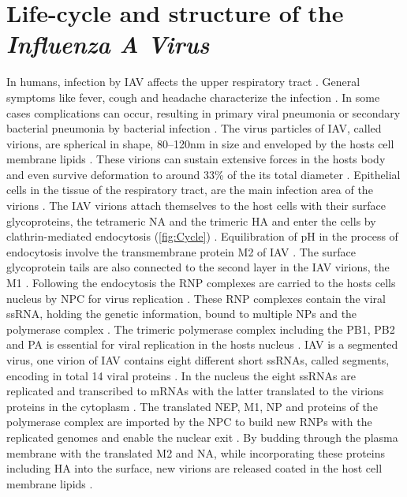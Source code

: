 \section{Life-cycle and structure of the \textit{Influenza A Virus}}

In humans, infection by \gls{IAV} affects the upper respiratory tract \autocite{julkunen_inflammatory_2000}. General symptoms like fever, cough and headache characterize the infection \autocite{julkunen_inflammatory_2000}. In some cases complications can occur, resulting in primary viral pneumonia or secondary bacterial pneumonia by bacterial infection \autocite{julkunen_inflammatory_2000}. The virus particles of \gls{IAV}, called virions, are spherical in shape, 80–120nm in size and enveloped by the hosts cell membrane lipids \autocite{oxford_chapter_1987, mudhakir_learning_2009, cann_chapter_2016}. These virions can sustain extensive forces in the hosts body and even survive deformation to around 33\% of the its total diameter \autocite{schaap_effect_2012}. Epithelial cells in the tissue of the respiratory tract, are the main infection area of the virions \autocite{oxford_chapter_1987}. The \gls{IAV} virions attach themselves to the host cells with their surface glycoproteins, the tetrameric \gls{NA} and the trimeric \gls{HA} and enter the cells by clathrin-mediated endocytosis (\autoref{fig:Cycle}) \autocite{wilson_structure_1981, varghese_structure_1983, jones_global_2008, mudhakir_learning_2009}. Equilibration of pH in the process of endocytosis involve the transmembrane protein \gls{M2} of \gls{IAV} \autocite{pielak_influenza_2011}. The surface glycoprotein tails are also connected to the second layer in the \gls{IAV} virions, the \gls{M1} \autocite{ali_influenza_2000}. Following the endocytosis the \gls{RNP} complexes are carried to the hosts cells nucleus by \gls{NPC} for virus replication \autocite{eisfeld_at_2015}. These \gls{RNP} complexes contain the viral \gls{ssRNA}, holding the genetic information, bound to multiple \glspl{NP} and the polymerase complex \autocite{eisfeld_at_2015}. The trimeric polymerase complex including the \gls{PB1}, \gls{PB2} and \gls{PA} is essential for viral replication in the hosts nucleus \autocite{area_3d_2004, eisfeld_at_2015}. \gls{IAV} is a segmented virus, one virion of \gls{IAV} contains eight different short \glspl{ssRNA}, called segments, encoding in total 14 viral proteins \autocite{eisfeld_at_2015}. In the nucleus the eight \glspl{ssRNA} are replicated and transcribed to \glspl{mRNA} with the latter translated to the virions proteins in the cytoplasm \autocite{eisfeld_at_2015}. The translated \gls{NEP}, \gls{M1}, \gls{NP} and proteins of the polymerase complex are imported by the \gls{NPC} to build new \glspl{RNP} with the replicated genomes and enable the nuclear exit \autocite{eisfeld_at_2015}. By budding through the plasma membrane with the translated \gls{M2} and \gls{NA}, while incorporating these proteins including \gls{HA} into the surface, new virions are released coated in the host cell membrane lipids \autocite{eisfeld_at_2015}.

